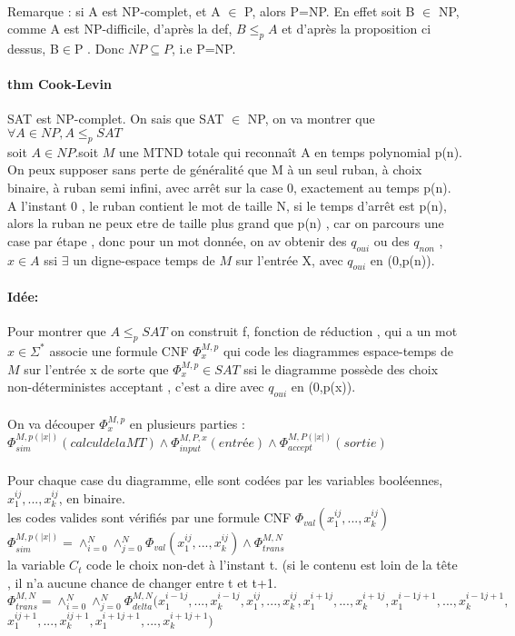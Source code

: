 \documentclass{article}
\begin{document}
\paragraph{} Remarque  : si A est NP-complet, et A $\in$ P, alors P=NP. En effet soit B $\in$ NP, comme A est NP-difficile, d’après la def, $B \leq_p A$ et d’après la proposition ci dessus, B$\in$P . Donc $NP \subseteq P$, i.e P=NP.
\paragraph{thm Cook-Levin} SAT est NP-complet. On sais que SAT $\in$ NP, on va montrer que $\forall A \in NP, A \leq_p SAT$\\soit $A \in NP$.soit $M$ une MTND totale qui reconnaît A en temps polynomial p(n). \\On peux supposer sans perte de généralité que M à  un seul ruban, à choix binaire, à ruban semi infini, avec arrêt sur la case 0, exactement au temps p(n). \\A l'instant 0 , le ruban contient le mot de taille N, si le temps d’arrêt est p(n), alors la ruban ne peux etre de taille plus grand que p(n) , car on parcours une case par étape , donc pour un mot donnée, on av obtenir des $q_{oui}$ ou des $q_{non}$ , $x \in A $ ssi $\exists$ un digne-espace temps de $M$ sur l'entrée X, avec $q_{oui}$ en (0,p(n)).
\paragraph{Idée:} Pour montrer que $A \leq_p SAT$ on construit f, fonction de réduction , qui a un mot $x\in \Sigma^*$ associe une formule CNF $\Phi_x^{M,p}$ qui code les diagrammes espace-temps de $M$ sur l'entrée x de sorte que $\Phi_x^{M,p} \in SAT$ ssi le diagramme possède des choix non-déterministes acceptant , c’est a dire avec $q_{oui}$ en (0,p(x)).\\\\On va découper $\Phi_x^{M,p}$ en plusieurs parties :\\
 $\Phi_{sim}^{M,p(|x|)} (calcul de la MT)\wedge \Phi_{input}^{M,P,x}(entrée) \wedge \Phi_{accept}^{M,P(|x|)}(sortie)$
  \\\\Pour chaque case du diagramme, elle sont codées par les variables booléennes, $x_1^{ij},...,x_k^{ij}$, en binaire.
  \\les codes valides sont vérifiés par une formule CNF $\Phi_{val}(x_1^{ij},...,x_k^{ij})$\\
  $\Phi_{sim}^{M,p(|x|)} = \wedge_{i=0}^N \wedge_{j=0}^N \Phi_{val} (x_1^{ij},...,x_k^{ij}) \wedge \Phi_{trans}^{M,N}$\\
  la variable $C_t$ code le choix non-det à l'instant t. (si le contenu est loin de la tête , il n'a aucune chance de changer entre t et t+1.\\
  $\Phi_{trans}^{M,N} = \wedge_{i=0}^N \wedge_{j=0}^N \Phi_{delta}^{M,N}(x_1^{i-1j},...,x_k^{i-1j},x_1^{ij},...,x_k^{ij},x_1^{i+1j},...,x_k^{i+1j},x_1^{i-1j+1},...,x_k^{i-1j+1},$\\$
  x_1^{ij+1},...,x_k^{ij+1},x_1^{i+1j+1},...,x_k^{i+1j+1})$
  
\end{document}

